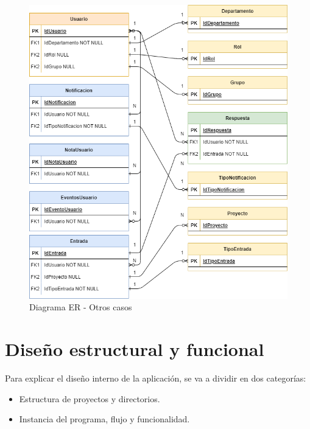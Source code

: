 \begin{figure}[H]
    \centering
    \includegraphics[width=\linewidth]{img/diagramaER2_TFG.png}
    \caption{Diagrama ER - Otros casos}  
\end{figure}

\section{Diseño estructural y funcional}
Para explicar el diseño interno de la aplicación, se va a dividir en dos categorías:
\begin{itemize}
    \item Estructura de proyectos y directorios.
    \item Instancia del programa, flujo y funcionalidad.
\end{itemize}

